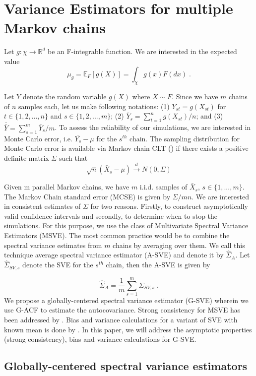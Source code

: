 \documentclass[11pt]{article}
\theoremstyle{remark}
\begin{document}
\section{Variance Estimators for multiple Markov chains} \label{sec:variance_est}

Let $g:\chi \longrightarrow \mathbb{R}^d$ be an F-integrable function. We are interested in the expected value
%
\[
\mu_g = \mathbb{E}_F[g(X)] = \int_{\chi}g(x)F(dx)\;.
\]
 
Let $Y$ denote the random variable $g(X)$ where $X \sim F$. Since we have $m$ chains of $n$ samples each, let us make following notations: (1) $Y_{st} = g(X_{st})$ for $t \in \{1, 2, ..., n\}$ and $s \in \{1, 2, ..., m\}$; (2) $\bar{Y}_s = \sum_{t=1}^{n}g(X_{st})/n$; and (3) $\bar{\bar{Y}} = \sum_{s=1}^{m}\bar{Y}_s/m$. To assess the reliability of our simulations, we are interested in Monte Carlo error, i.e. $\bar{Y_s} - \mu$ for the $s^{th}$ chain. The sampling distribution for Monte Carlo error is available via Markov chain CLT (\cite{jones2004markov}) if there exists a positive definite matrix $\Sigma$ such that
%
{\color{blue} }
\[
\sqrt{n}(\bar{X}_s-\mu) \xrightarrow{d} N(0,\Sigma)
\]

 Given m parallel Markov chains, we have $m$ i.i.d. samples of $\bar{X}_s$, $s \in \{1,..., m\}$. The Markov Chain standard error (MCSE) is given by $\Sigma/mn$. We are interested in consistent estimates of $\Sigma$ for two reasons. Firstly, to construct asymptotically valid confidence intervals and secondly, to determine when to stop the simulations. For this purpose, we use the class of Multivariate Spectral Variance Estimators (MSVE). The most common practice would be to combine the spectral variance estimates from $m$ chains by averaging over them. We call this technique average spectral variance estimator (A-SVE) and denote it by $\hat{\Sigma}_A$. Let $\hat{\Sigma}_{SV,s}$ denote the SVE for the $s^{th}$ chain, then the A-SVE is given by

\[
\hat{\Sigma}_A = \dfrac{1}{m}\sum_{s=1}^{m}\hat{\Sigma}_{SV,s}\;.
\]
 We propose a globally-centered spectral variance estimator (G-SVE) wherein we use G-ACF to estimate the autocovariance. Strong consistency for MSVE has been addressed by \cite{vats:fleg:jon:2018}. Bias and variance calculations for a variant of SVE with known mean is done by \cite{hannan2009multiple}. In this paper, we will address the asymptotic properties (strong consistency), bias and variance calculations for G-SVE. 

\subsection{Globally-centered spectral variance estimators} %
\label{sub:globally_centered_spectral_variance_estimators}
\end{document}

